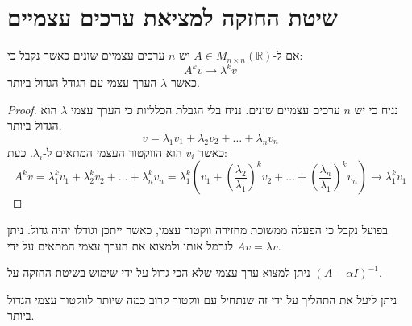 \documentclass{tstextbook}
\begin{document}
\section{שיטת החזקה למציאת ערכים עצמיים}

\begin{proposition}
אם ל-\(A \in M_{n\times n}\left( \mathbb{R} \right)\) יש \(n\) ערכים עצמיים שונים כאשר נקבל כי:
$$A^{k}v\to \lambda^{k}v$$
כאשר \(\lambda\) הערך עצמי עם הגודל הגדול ביותר. 

\end{proposition}
\begin{proof}
נניח כי יש \(n\) ערכים עצמיים שונים. נניח בלי הגבלת הכלליות כי הערך עצמי \(\lambda\) הוא הגדול ביותר.
$$v=\lambda_{1}v_{1}+\lambda_{2}v_{2}+\dots+\lambda_{n}v_{n}$$
כאשר \(v_{i}\) הוא הווקטור העצמי המתאים ל-\(\lambda_{i}\). כעת:
$$A^{k}v=\lambda_{1}^{k}v_{1}+\lambda_{2}^{k}v_{2}+\dots+\lambda_{n}^{k}v_{n}=\lambda_{1}^{k}\left( v_{1}+\left( \frac{\lambda_{2}}{\lambda_{1}} \right)^{k}v_{2}+\dots+\left( \frac{\lambda_{n}}{\lambda_{1}} \right)^{k}v_{n} \right)\to \lambda_{1}^{k}v_{1}$$

\end{proof}
\begin{remark}
בפועל נקבל כי הפעלה ממשוכת מחזירה ווקטור עצמי, כאשר ייתכן וגודלו יהיה גדול. ניתן לנרמל אותו ולמצוא את הערך עצמי המתאים על ידי \(Av=\lambda v\).

\end{remark}
\begin{proposition}
ניתן למצוא ערך עצמי שלא הכי גדול על ידי שימוש בשיטת החזקה על \(\left( A-\alpha I \right) ^{-1}\). 

\end{proposition}
ניתן ליעל את התהליך על ידי זה שנתחיל עם ווקטור קרוב כמה שיותר לווקטור עצמי הגדול ביותר.
\end{document}
